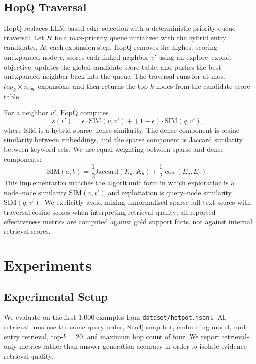 \subsection{HopQ Traversal}
\label{sec:method-hopq}

HopQ replaces LLM-based edge selection with a deterministic priority-queue
traversal. Let $H$ be a max-priority queue initialized with the hybrid entry
candidates. At each expansion step, HopQ removes the highest-scoring unexpanded
node $v$, scores each linked neighbor $v'$ using an explore--exploit objective,
updates the global candidate score table, and pushes the best unexpanded
neighbor back into the queue. The traversal runs for at most
$top_k \times n_{hop}$ expansions and then returns the top-$k$ nodes from the
candidate score table.

For a neighbor $v'$, HopQ computes
\begin{equation}
    s(v') = \epsilon \cdot \mathrm{SIM}(v, v') + (1 - \epsilon) \cdot \mathrm{SIM}(q, v'),
\end{equation}
where $\mathrm{SIM}$ is a hybrid sparse--dense similarity. The dense component
is cosine similarity between embeddings, and the sparse component is Jaccard
similarity between keyword sets. We use equal weighting between sparse and dense
components:
\begin{equation}
    \mathrm{SIM}(a,b) = \frac{1}{2}\mathrm{Jaccard}(K_a,K_b) + \frac{1}{2}\cos(E_a,E_b).
\end{equation}
This implementation matches the algorithmic form in which exploration is a
node--node similarity $\mathrm{SIM}(v,v')$ and exploitation is query--node
similarity $\mathrm{SIM}(q,v')$. We explicitly avoid mixing unnormalized sparse
full-text scores with traversal cosine scores when interpreting retrieval
quality; all reported effectiveness metrics are computed against gold support
facts, not against internal retrieval scores.

\section{Experiments}
\label{sec:experiments}

\subsection{Experimental Setup}
\label{sec:experimental-setup}

We evaluate on the first 1{,}000 examples from \texttt{dataset/hotpot.jsonl}.
All retrieval runs use the same query order, Neo4j snapshot, embedding model,
node-entry retrieval, top-$k=20$, and maximum hop count of four. We report
retrieval-only metrics rather than answer-generation accuracy in order to
isolate evidence retrieval quality.

